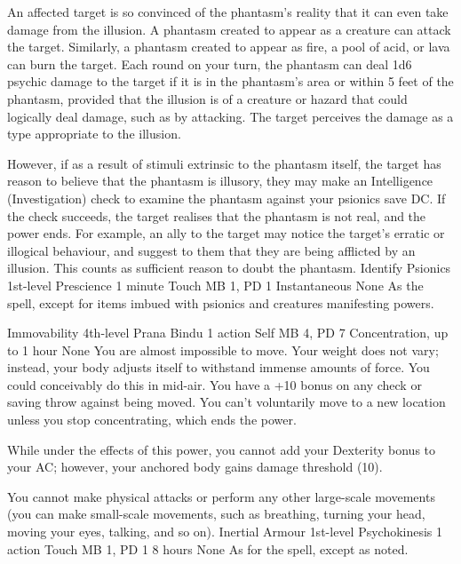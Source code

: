 An affected target is so convinced of the phantasm's reality
that it can even take damage from the illusion.
A phantasm created to appear as a creature can attack the target.
Similarly, a phantasm created to appear as fire, a pool of acid,
or lava can burn the target. Each round on your turn,
the phantasm can deal 1d6 psychic damage to the target
if it is in the phantasm's area or within 5 feet of the phantasm,
provided that the illusion is of a creature or hazard
that could logically deal damage, such as by attacking.
The target perceives the damage as a type appropriate to the illusion.

However, if as a result of stimuli extrinsic to the phantasm itself,
the target has reason to believe that the phantasm is illusory, 
they may make an Intelligence (Investigation) check to examine the phantasm
against your psionics save DC.
If the check succeeds, the target realises that the phantasm is not real,
and the power ends.
For example, an ally to the target may notice the target's erratic or
illogical behaviour, and suggest to them that they are being afflicted
by an illusion. This counts as sufficient reason to doubt the phantasm.
\DndPowerHeader%
    {Identify Psionics\label{pwr:identify_psionics}}
    {1st-level Prescience}
    {1 minute}
    {Touch}
    {MB 1, PD 1}
    {Instantaneous}
    {None}
As the  spell, except for
items imbued with psionics and creatures manifesting powers.

\DndPowerHeader%
    {Immovability\label{pwr:immovability}}
    {4th-level Prana Bindu}
    {1 action}
    {Self}
    {MB 4, PD 7}
    {Concentration, up to 1 hour}
    {None}
You are almost impossible to move.
Your weight does not vary;
instead, your body adjusts itself to withstand immense amounts
of force. You could conceivably do this in mid-air. You have
a +10 bonus on any check or saving throw against being moved.
You can't voluntarily move to a new location unless you stop
concentrating, which ends the power.

While under the effects of this power, you cannot add your
Dexterity bonus to your AC; however, your anchored body gains
damage threshold (10).

You cannot make physical attacks or perform any other large-scale
movements (you can make small-scale movements, such as breathing,
turning your head, moving your eyes, talking, and so on).
\DndPowerHeader%
    {Inertial Armour\label{pwr:inertial_armour}}
    {1st-level Psychokinesis}
    {1 action}
    {Touch}
    {MB 1, PD 1}
    {8 hours}
    {None}
As for the  spell, except
as noted.

